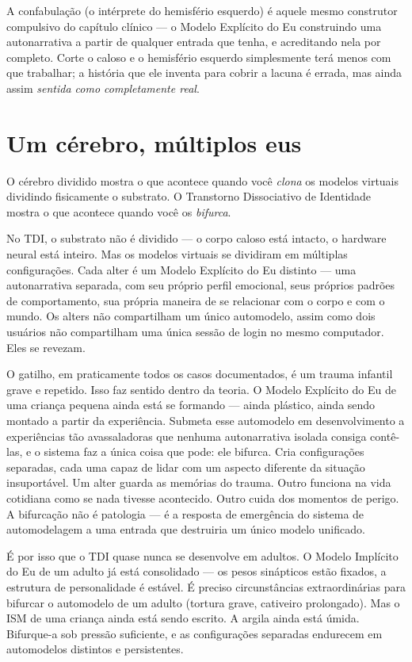 \documentclass[11pt, twoside, openright]{book}
\begin{document}
A confabulação (o intérprete do hemisfério esquerdo) é aquele mesmo construtor compulsivo do capítulo clínico --- o Modelo Explícito do Eu construindo uma autonarrativa a partir de qualquer entrada que tenha, e acreditando nela por completo. Corte o caloso e o hemisfério esquerdo simplesmente terá menos com que trabalhar; a história que ele inventa para cobrir a lacuna é errada, mas ainda assim \textit{sentida como completamente real}.

\section*{Um cérebro, múltiplos eus}

O cérebro dividido mostra o que acontece quando você \textit{clona} os modelos virtuais dividindo fisicamente o substrato. O Transtorno Dissociativo de Identidade mostra o que acontece quando você os \textit{bifurca}.

No TDI, o substrato não é dividido --- o corpo caloso está intacto, o hardware neural está inteiro. Mas os modelos virtuais se dividiram em múltiplas configurações. Cada alter é um Modelo Explícito do Eu distinto --- uma autonarrativa separada, com seu próprio perfil emocional, seus próprios padrões de comportamento, sua própria maneira de se relacionar com o corpo e com o mundo. Os alters não compartilham um único automodelo, assim como dois usuários não compartilham uma única sessão de login no mesmo computador. Eles se revezam.

O gatilho, em praticamente todos os casos documentados, é um trauma infantil grave e repetido. Isso faz sentido dentro da teoria. O Modelo Explícito do Eu de uma criança pequena ainda está se formando --- ainda plástico, ainda sendo montado a partir da experiência. Submeta esse automodelo em desenvolvimento a experiências tão avassaladoras que nenhuma autonarrativa isolada consiga contê-las, e o sistema faz a única coisa que pode: ele bifurca. Cria configurações separadas, cada uma capaz de lidar com um aspecto diferente da situação insuportável. Um alter guarda as memórias do trauma. Outro funciona na vida cotidiana como se nada tivesse acontecido. Outro cuida dos momentos de perigo. A bifurcação não é patologia --- é a resposta de emergência do sistema de automodelagem a uma entrada que destruiria um único modelo unificado.

É por isso que o TDI quase nunca se desenvolve em adultos. O Modelo Implícito do Eu de um adulto já está consolidado --- os pesos sinápticos estão fixados, a estrutura de personalidade é estável. É preciso circunstâncias extraordinárias para bifurcar o automodelo de um adulto (tortura grave, cativeiro prolongado). Mas o ISM de uma criança ainda está sendo escrito. A argila ainda está úmida. Bifurque-a sob pressão suficiente, e as configurações separadas endurecem em automodelos distintos e persistentes.
\end{document}
